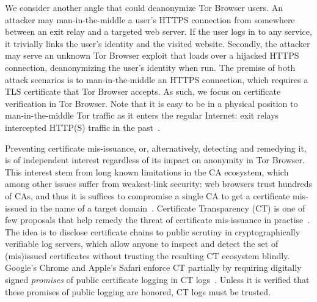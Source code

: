 %
%
%
We consider another angle that could deanonymize Tor Browser users.
An attacker may man-in-the-middle a user's HTTPS connection from somewhere
between an exit relay and a targeted web server.  If the user logs in to any
service, it trivially links the user's identity and the visited website.
Secondly, the attacker may serve an unknown Tor Browser exploit that loads over
a hijacked HTTPS connection, deanonymizing the user's identity when run.
The premise of both attack scenarios is to man-in-the-middle an HTTPS
connection, which requires a TLS certificate that Tor Browser accepts.  As
such, we focus on certificate verification in Tor Browser.  Note that it is
easy to be in a physical position to man-in-the-middle Tor traffic as it enters
the regular Internet:
	exit relays intercepted HTTP(S) traffic in the past~\cite{spoiled-onions}.

%
Preventing certificate mis-issuance, or, alternatively, detecting and remedying
it, is of independent interest regardless of its impact on anonymity in Tor
Browser.  This interest stem from long known limitations in the CA ecosystem,
which among other issues suffer from weakest-link security:
	web browsers trust hundreds of CAs, and thus it is suffices to compromise
	a single CA to get a certificate mis-issued in the name of a target
	domain~\cite{ca-ecosystem,https-sok}.
Certificate Transparency (CT) is one of few proposals that help remedy the
threat of certificate mis-issuance in practise~\cite{ct/a,ct,ct/bis}.  The idea
is to disclose certificate chains to public scrutiny in cryptographically
verifiable log servers, which allow anyone to inspect and detect the set of
(mis)issued certificates without trusting the resulting CT ecosystem blindly.
Google's Chrome and Apple's Safari enforce CT partially by requiring
digitally signed \emph{promises} of public certificate logging in CT
logs~\cite{chrome-policy,safari-policy}.  Unless it is verified that these
promises of public logging are honored, CT logs must be trusted.

